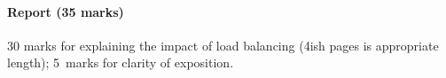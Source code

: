 \documentclass[letterpaper,10pt]{article}
\begin{document}

\paragraph{Report (35 marks)} 30 marks for explaining the impact of load balancing (4ish pages is appropriate length); 5~marks for clarity of exposition.
\end{document}
